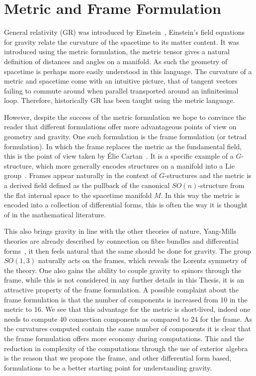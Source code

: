 \documentclass[10pt]{report}
\theoremstyle{definition}
\begin{document}
    \newpage
\chapter{Metric and Frame Formulation}\label{chap:metric-frame-formulation}
General relativity (GR) was introduced by Einstein~\cite{AEinsteinTheoryGravitation1915}, Einstein's field equations for gravity relate the curvature of the spacetime to its matter content. It was introduced using the metric formulation, the metric tensor gives a natural definition of distances and angles on a manifold. As such the geometry of spacetime is perhaps more easily understood in this language. The curvature of a metric and spacetime come with an intuitive picture, that of tangent vectors failing to commute around when parallel transported around an infinitesimal loop. Therefore, historically GR has been taught using the metric language.

However, despite the success of the metric formulation we hope to convince the reader that different formulations offer more advantageous points of view on geometry and gravity. One such formulation is the frame formulation (or tetrad formulation). In which the frame replaces the metric as the fundamental field, this is the point of view taken by \'Elie Cartan~\cite{JMPA_1922_9_1__141_0,zbMATH02603088}. It is a specific example of a $G$-structure, which more generally encodes structures on a manifold into a Lie group~\cite{The_geometry_of_Chern_1966}. Frames appear naturally in the context of $G$-structures and the metric is a derived field defined as the pullback of the canonical $SO(n)$-structure from the flat internal space to the spacetime manifold $M$. In this way the metric is encoded into a collection of differential forms, this is often the way it is thought of in the mathematical literature.

This also brings gravity in line with the other theories of nature, Yang-Mills theories are already described by connection on fibre bundles and differential forms~\cite{The_Mathematica_Marath_1992}, it then feels natural that the same should be done for gravity. The group $SO(1,3)$ naturally acts on the frames, which reveals the Lorentz symmetry of the theory. One also gains the ability to couple gravity to spinors through the frame, while this is not considered in any further details in this Thesis, it is an attractive property of the frame formulation. A possible complaint about the frame formulation is that the number of components is increased from 10 in the metric to 16. We see that this advantage for the metric is short-lived, indeed one needs to compute 40 connection components as compared to 24 for the frame. As the curvatures computed contain the same number of components it is clear that the frame formulation offers more economy during computations. This and the reduction in complexity of the computations through the use of exterior algebra is the reason that we propose the frame, and other differential form based, formulations to be a better starting point for understanding gravity.
\end{document}
